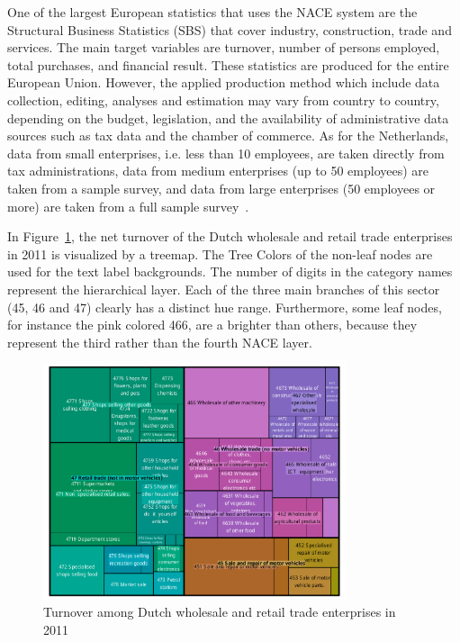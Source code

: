 \documentclass[journal]{vgtc}                %
\begin{document}
One of the largest European statistics that uses the NACE system are the Structural Business Statistics (SBS) that cover industry, construction, trade and services. The main target variables are turnover, number of persons employed, total purchases, and financial result. These statistics are produced for the entire European Union. However, the applied production method which include data collection, editing, analyses and estimation may vary from country to country, depending on the budget, legislation, and the availability of administrative data sources such as tax data and the chamber of commerce. As for the Netherlands, data from small enterprises, i.e. less than 10 employees, are taken directly from tax administrations, data from medium enterprises (up to 50 employees) are taken from a sample survey, and data from large enterprises (50 employees or more) are taken from a full sample survey~\cite{cbsSBS}.


In Figure~\ref{fig:treemapApp}, the net turnover of the Dutch wholesale and retail trade enterprises in 2011 is visualized by a treemap. The Tree Colors of the non-leaf nodes are used for the text label backgrounds. The number of digits in the category names represent the hierarchical layer. Each of the three main branches of this sector (45, 46 and 47) clearly has a distinct hue range. Furthermore, some leaf nodes, for instance the pink colored 466, are a brighter than others, because they represent the third rather than the fourth NACE layer.

\begin{figure}[tb]
  \centering
  \includegraphics[width=3.5in]{TMbusiness.pdf}
  \caption{Turnover among Dutch wholesale and retail trade enterprises in 2011}\label{fig:treemapApp}
\end{figure}
\end{document}
